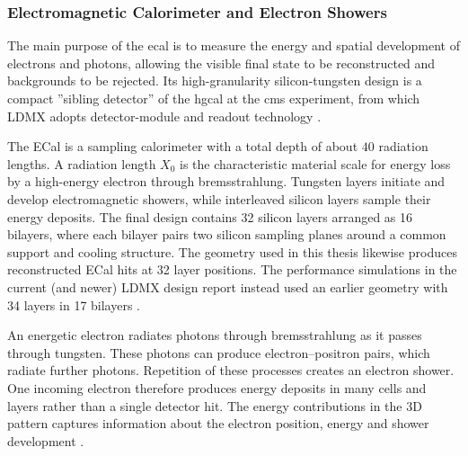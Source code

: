 \subsubsection{Electromagnetic Calorimeter and Electron Showers}

The main purpose of the \gls{ecal} is to measure the energy and spatial
development of electrons and photons, allowing the visible final state to be
reconstructed and backgrounds to be rejected. Its high-granularity 
silicon-tungsten design is a compact ''sibling detector'' of the \gls{hgcal} at the \gls{cms} experiment, from which LDMX adopts detector-module and readout technology
\cite{ldmx2025-overview}.


The ECal is a sampling calorimeter with a total depth of about \(40\)
radiation lengths. A radiation length \(X_0\) is the characteristic material
scale for energy loss by a high-energy electron through bremsstrahlung.
Tungsten layers initiate and develop electromagnetic showers, while
interleaved silicon layers sample their energy deposits. The final design
contains 32 silicon layers arranged as 16 bilayers, where each bilayer pairs
two silicon sampling planes around a common support and cooling structure.
The  geometry used in this thesis likewise produces
reconstructed ECal hits at 32 layer positions. The performance simulations in
the current (and newer) LDMX design report instead used an earlier geometry with 34
layers in 17 bilayers \cite{ldmx2025-overview}.

An energetic electron radiates photons through \gls{bremsstrahlung} as it
passes through tungsten. These photons can produce electron--positron pairs,
which radiate further photons. Repetition of these processes creates an
\gls{electron shower}. One incoming electron therefore produces energy
deposits in many cells and layers rather than a single detector hit. The energy contributions in the 3D pattern captures information about the electron position,
energy and shower development \cite{groom2024-passage-particles}.


